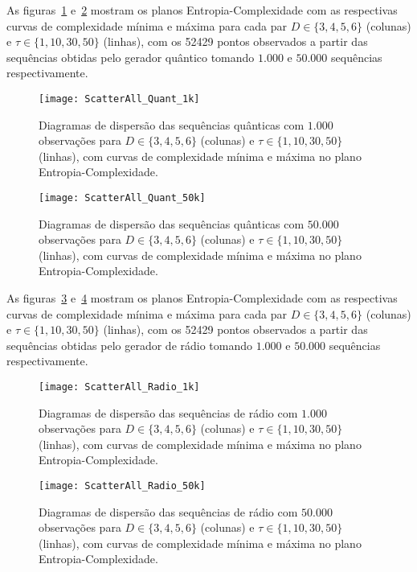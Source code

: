 As figuras~\ref{Fig:ScatterAll_Quant_1k} e~\ref{Fig:ScatterAll_Quant_50k} mostram os planos Entropia-Complexidade com as respectivas curvas de complexidade mínima e máxima para cada par $D\in\{3, 4, 5, 6\}$ (colunas) e $\tau\in\{1, 10, 30, 50\}$ (linhas), com os \num{52429} pontos observados a partir das sequências obtidas pelo gerador quântico tomando $1.000$ e $50.000$ sequências respectivamente.


\begin{figure}[hbt]
	\centering
	\texttt{[image: ScatterAll\_Quant\_1k]}
	\caption{Diagramas de dispersão das sequências quânticas com $1.000$ observações para $D\in\{3, 4, 5, 6\}$ (colunas) e $\tau\in\{1, 10, 30, 50\}$ (linhas), com curvas de complexidade mínima e máxima no plano Entropia-Complexidade.}\label{Fig:ScatterAll_Quant_1k}
\end{figure}

\begin{figure}[hbt]
	\centering
	\texttt{[image: ScatterAll\_Quant\_50k]}
	\caption{Diagramas de dispersão das sequências quânticas com $50.000$ observações para $D\in\{3, 4, 5, 6\}$ (colunas) e $\tau\in\{1, 10, 30, 50\}$ (linhas), com curvas de complexidade mínima e máxima no plano Entropia-Complexidade.}\label{Fig:ScatterAll_Quant_50k}
\end{figure}

As figuras~\ref{Fig:ScatterAll_Radio_1k} e~\ref{Fig:ScatterAll_Radio_50k} mostram os planos Entropia-Complexidade com as respectivas curvas de complexidade mínima e máxima para cada par $D\in\{3, 4, 5, 6\}$ (colunas) e $\tau\in\{1, 10, 30, 50\}$ (linhas), com os \num{52429} pontos observados a partir das sequências obtidas pelo gerador de rádio tomando $1.000$ e $50.000$ sequências respectivamente.


\begin{figure}[hbt]
	\centering
	\texttt{[image: ScatterAll\_Radio\_1k]}
	\caption{Diagramas de dispersão das sequências de rádio com $1.000$ observações para $D\in\{3, 4, 5, 6\}$ (colunas) e $\tau\in\{1, 10, 30, 50\}$ (linhas), com curvas de complexidade mínima e máxima no plano Entropia-Complexidade.}\label{Fig:ScatterAll_Radio_1k}
\end{figure}

\begin{figure}[hbt]
	\centering
	\texttt{[image: ScatterAll\_Radio\_50k]}
	\caption{Diagramas de dispersão das sequências de rádio com $50.000$ observações para $D\in\{3, 4, 5, 6\}$ (colunas) e $\tau\in\{1, 10, 30, 50\}$ (linhas), com curvas de complexidade mínima e máxima no plano Entropia-Complexidade.}\label{Fig:ScatterAll_Radio_50k}
\end{figure}

